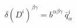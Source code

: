 \begin{equation}
\delta(D^i)^{\beta\gamma} = b^{\alpha\beta\gamma}~\bar{q}_\alpha^i   \label{eq:iki}
\end{equation}

